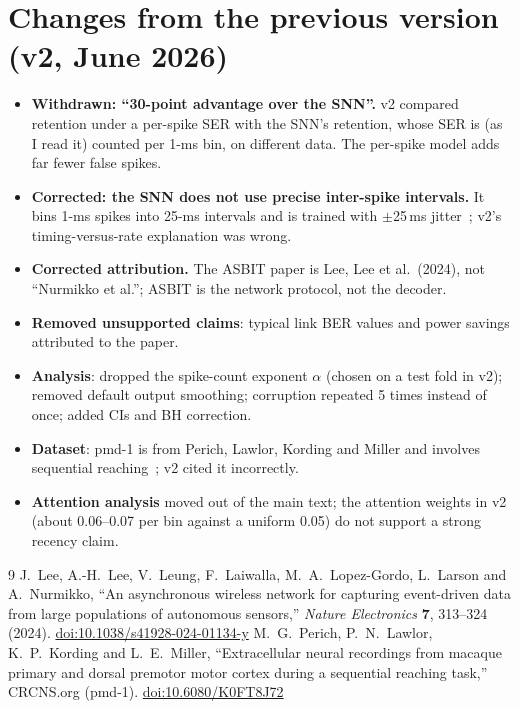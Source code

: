 \documentclass[11pt,a4paper]{article}
\begin{document}
\section{Changes from the previous version (v2, June 2026)}\label{app:changes}
\begin{itemize}
  \item \textbf{Withdrawn: ``30-point advantage over the SNN''.} v2 compared retention under a per-spike SER with the
  SNN's retention, whose SER is (as I read it) counted per 1-ms bin, on different data. The per-spike model adds far fewer false spikes.
  \item \textbf{Corrected: the SNN does not use precise inter-spike intervals.} It bins 1-ms spikes into 25-ms intervals
  and is trained with $\pm$25\,ms jitter~\cite{lee2024}; v2's timing-versus-rate explanation was wrong.
  \item \textbf{Corrected attribution.} The ASBIT paper is Lee, Lee et al.\ (2024), not ``Nurmikko et al.'';
  ASBIT is the network protocol, not the decoder.
  \item \textbf{Removed unsupported claims}: typical link BER values and power savings attributed to the paper.
  \item \textbf{Analysis}: dropped the spike-count exponent $\alpha$ (chosen on a test fold in v2); removed default
  output smoothing; corruption repeated 5 times instead of once; added CIs and BH correction.
  \item \textbf{Dataset}: pmd-1 is from Perich, Lawlor, Kording and Miller and involves sequential reaching~\cite{pmd1};
  v2 cited it incorrectly.
  \item \textbf{Attention analysis} moved out of the main text; the attention weights in v2 (about 0.06--0.07 per bin
  against a uniform 0.05) do not support a strong recency claim.
\end{itemize}

\begin{thebibliography}{9}\small
{} J.~Lee, A.-H.~Lee, V.~Leung, F.~Laiwalla, M.~A.~Lopez-Gordo, L.~Larson and A.~Nurmikko,
``An asynchronous wireless network for capturing event-driven data from large populations of autonomous sensors,''
\textit{Nature Electronics} \textbf{7}, 313--324 (2024). \href{https://doi.org/10.1038/s41928-024-01134-y}{doi:10.1038/s41928-024-01134-y}
 M.~G.~Perich, P.~N.~Lawlor, K.~P.~Kording and L.~E.~Miller, ``Extracellular neural recordings from
macaque primary and dorsal premotor motor cortex during a sequential reaching task,'' CRCNS.org (pmd-1).
\href{https://doi.org/10.6080/K0FT8J72}{doi:10.6080/K0FT8J72}
\end{thebibliography}
\end{document}
